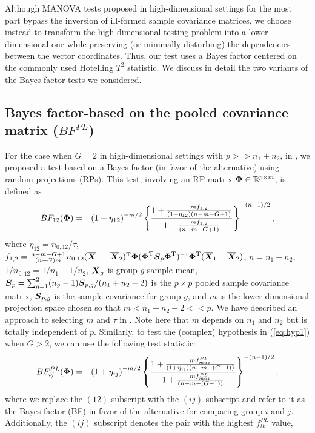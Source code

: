 \documentclass[times,sort&compress,3p]{elsarticle}
\theoremstyle{plain}%
\theoremstyle{definition}
\def\be{\begin{eqnarray}}
\def\ee{\end{eqnarray}}
\def\trans{^{\rm T}}
\newcommand{\uR}       {\mbox{\boldmath$R$}}
\newcommand{\uS}       {\mbox{\boldmath$S$}}
\newcommand{\uX}       {\mbox{\boldmath$X$}}
\newcommand{\uPhi}              {\mbox{\boldmath$\Phi$}}
\newcommand{\rsz}[1]{\textcolor{red}{#1}}
\begin{document}
Although MANOVA tests proposed in high-dimensional settings for the most part bypass the inversion of ill-formed sample covariance matrices, we choose instead to transform the high-dimensional testing problem into a lower-dimensional one while preserving (or minimally disturbing) the dependencies between the vector coordinates. Thus, our test uses a Bayes factor centered on the commonly used Hotelling $T^{2}$ statistic. We discuss in detail the two variants of the Bayes factor tests we considered.

\subsection{Bayes factor-based on the pooled covariance matrix ($BF^{PL}_{}$)} \label{sec:testpl}
For the case when $G = 2$ in high-dimensional settings with $p >> n_1+n_2$, in  \cite{zoh2018powerful}, we proposed a test based on a Bayes factor (in favor of the alternative) using random projections (RPs). This test, involving an RP matrix $\uPhi \in \mathbb{R}^{p \times m}$, is defined as
\be
BF_{12}(\uPhi) &=& \left(1 + \eta_{12} \right)^{-m/2} \left\{\frac{  1 + \frac{m f_{1,2}}{(1 + \eta_{12})(n-m-G+1)}}{ 1 + \frac{m f_{1,2}}{(n-m-G+1)}  } \right\}^{-(n-1)/2}, \label{eq:BF1}
\ee
where $\eta_{12} = n_{0,12}/\tau$, $f_{1,2}  = \frac{n-m-G+1}{(n-G)m} n_{0,12} (\overline{\uX}_1 - \overline{\uX}_2)\trans\uPhi(\uPhi\trans\uS_{p}\uPhi\trans)^{-1}\uPhi\trans(\overline{\uX}_1 - \overline{\uX}_2)$, $n = n_1 + n_2$,
 $ 1/n_{0,12} = 1/n_1 + 1/n_2$, $\overline{\uX}_g$ is group $g$ sample mean, $\uS_p = \sum_{g=1}^{2} (n_g -1)\uS_{p, g}/(n_1 +n_2-2)$ is the $p \times p$ pooled sample covariance matrix, $\uS_{p,g}$ is the sample covariance for group $g$, and $m$ is the lower dimensional projection space chosen so that $m < n_1 +n_2 - 2 << p$. We have described an approach to selecting $m$ and $\tau$ in \cite{zoh2018powerful}. Note here that $m$ depends on $n_1$ and $n_2$ but is totally independent of $p$.
 Similarly, to test the (complex) hypothesis in (\ref{eq:hyp1}) when $G > 2$, we can use the following test statistic:
\be
BF^{PL}_{ij}(\uPhi) &=& \left(1 + \eta_{ij} \right)^{-m/2} \left\{ \frac{  1 + \frac{m f^{PL}_{max}}{(1 + \eta_{ij})(n-m-(G-1))}}{ 1 + \frac{m f^{PL}_{max}}{(n-m-(G-1))}  } \right\}^{-(n-1)/2}, \label{eq:BFmax}
\ee
where we replace the $(12)$ subscript with the $(ij)$ subscript and refer to it as the Bayes factor (BF) in favor of the alternative for comparing group $i$ and $j$. Additionally, the $(ij)$ subscript denotes the pair with the highest $f^{PL}_{lk}$ value,
\end{document}
